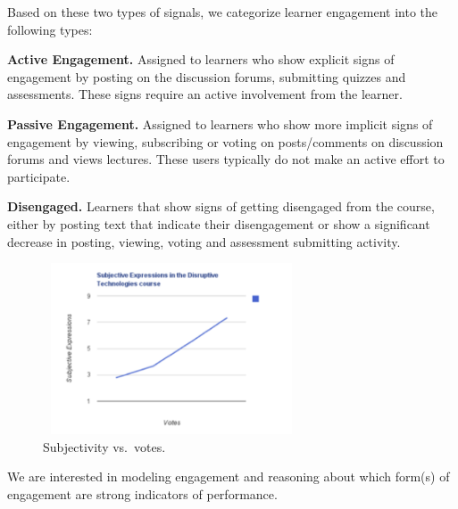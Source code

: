 Based on these two types of signals, we categorize learner engagement into the following types:

\textbf {Active Engagement.} Assigned to learners who show explicit signs of engagement by posting on the discussion forums, submitting quizzes and assessments. These signs require an active involvement from the learner.

\textbf{Passive Engagement.} Assigned to learners who show more implicit signs of engagement by viewing, subscribing or voting on posts/comments on discussion forums and views lectures. These users typically do not make an active effort to participate.

\textbf{Disengaged.} Learners that show signs of getting disengaged from the course, either by posting text that indicate their disengagement or show a significant decrease in posting, viewing, voting and assessment submitting activity.


\begin{figure} [ht]
\label{subj-disrtech}
\begin{center}
\includegraphics[width = 3.0in, height = 2in]{subjectivity-disrtech.png}
\caption{Subjectivity vs.\ votes.}
\end{center}
\end{figure}

We are interested in modeling engagement and reasoning about which form(s) of engagement are strong indicators of performance. 

